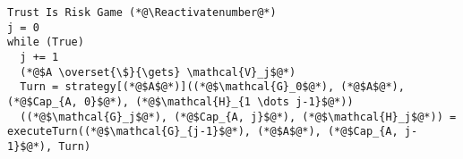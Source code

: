 {}
\Suppressnumber
\begin{lstlisting}[label=trustisriskgame, style=numbers]
Trust Is Risk Game (*@\Reactivatenumber@*)
j = 0
while (True)
  j += 1
  (*@$A \overset{\$}{\gets} \mathcal{V}_j$@*)
  Turn = strategy[(*@$A$@*)]((*@$\mathcal{G}_0$@*), (*@$A$@*), (*@$Cap_{A, 0}$@*), (*@$\mathcal{H}_{1 \dots j-1}$@*))
  ((*@$\mathcal{G}_j$@*), (*@$Cap_{A, j}$@*), (*@$\mathcal{H}_j$@*)) = executeTurn((*@$\mathcal{G}_{j-1}$@*), (*@$A$@*), (*@$Cap_{A, j-1}$@*), Turn)
\end{lstlisting}
